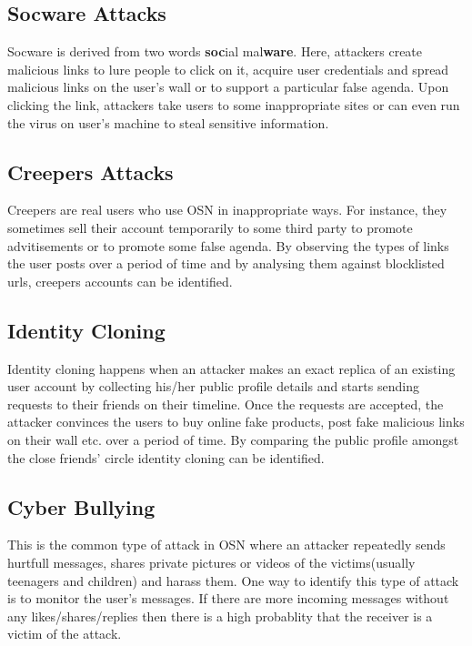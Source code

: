 \documentclass[conference]{IEEEtran}
\begin{document}
\subsection{Socware Attacks}
Socware is derived from two words \textbf{soc}ial mal\textbf{ware}. Here, attackers create malicious links to lure people to click on it, acquire user credentials and spread malicious links on the user's wall or to support a particular false agenda. Upon clicking the link, attackers take users to some inappropriate sites or can even run the virus on user's machine to steal sensitive information.

\subsection{Creepers Attacks}
Creepers are real users who use OSN in inappropriate ways. For instance, they sometimes sell their account temporarily to some third party to promote advitisements or to promote some false agenda. By observing the types of links the user posts over a period of time and by analysing them against blocklisted urls, creepers accounts can be identified.

\subsection{Identity Cloning}
Identity cloning happens when an attacker makes an exact replica of an existing user account by collecting his/her public profile details and starts sending requests to their friends on their timeline. Once the requests are accepted, the attacker convinces the users to buy online fake products, post fake malicious links on their wall etc. over a period of time. By comparing the public profile amongst the close friends' circle identity cloning can be identified.

\subsection{Cyber Bullying}
This is the common type of attack in OSN where an attacker repeatedly sends hurtfull messages, shares private pictures or videos of the victims(usually teenagers and children) and harass them. One way to identify this type of attack is to monitor the user's messages. If there are more incoming messages without any likes/shares/replies then there is a high probablity that the receiver is a victim of the attack.
\end{document}
